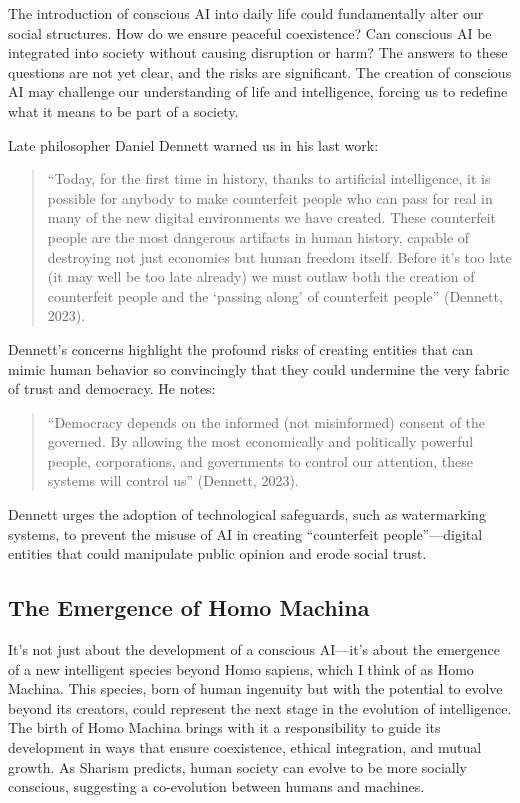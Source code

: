 \documentclass[
]{article}
\begin{document}
The introduction of conscious AI into daily life could fundamentally
alter our social structures. How do we ensure peaceful coexistence? Can
conscious AI be integrated into society without causing disruption or
harm? The answers to these questions are not yet clear, and the risks
are significant. The creation of conscious AI may challenge our
understanding of life and intelligence, forcing us to redefine what it
means to be part of a society.

Late philosopher Daniel Dennett warned us in his last work:

\begin{quote}
``Today, for the first time in history, thanks to artificial
intelligence, it is possible for anybody to make counterfeit people who
can pass for real in many of the new digital environments we have
created. These counterfeit people are the most dangerous artifacts in
human history, capable of destroying not just economies but human
freedom itself. Before it's too late (it may well be too late already)
we must outlaw both the creation of counterfeit people and the `passing
along' of counterfeit people'' (Dennett, 2023).
\end{quote}

Dennett's concerns highlight the profound risks of creating entities
that can mimic human behavior so convincingly that they could undermine
the very fabric of trust and democracy. He notes:

\begin{quote}
``Democracy depends on the informed (not misinformed) consent of the
governed. By allowing the most economically and politically powerful
people, corporations, and governments to control our attention, these
systems will control us'' (Dennett, 2023).
\end{quote}

Dennett urges the adoption of technological safeguards, such as
watermarking systems, to prevent the misuse of AI in creating
``counterfeit people''---digital entities that could manipulate public
opinion and erode social trust.

\hypertarget{the-emergence-of-homo-machina}{%
\subsection{The Emergence of Homo
Machina}\label{the-emergence-of-homo-machina}}

It's not just about the development of a conscious AI---it's about the
emergence of a new intelligent species beyond Homo sapiens, which I
think of as Homo Machina. This species, born of human ingenuity but with
the potential to evolve beyond its creators, could represent the next
stage in the evolution of intelligence. The birth of Homo Machina brings
with it a responsibility to guide its development in ways that ensure
coexistence, ethical integration, and mutual growth. As Sharism
predicts, human society can evolve to be more socially conscious,
suggesting a co-evolution between humans and machines.
\end{document}
